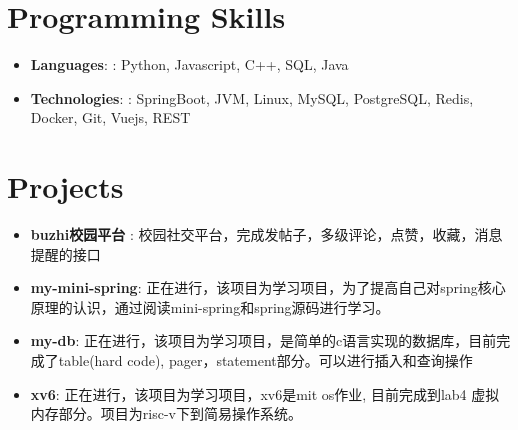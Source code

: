 \documentclass[letterpaper,11pt]{article}
\newcommand{\resumeItem}[2]{
  \item\small{
    \textbf{#1}{: #2 \vspace{-2pt}}
  }
}
\newcommand{\resumeSubItem}[2]{\resumeItem{#1}{#2}\vspace{-4pt}}
\newcommand{\resumeSubHeadingListStart}{\begin{itemize}[leftmargin=*]}
\newcommand{\resumeSubHeadingListEnd}{\end{itemize}}
\begin{document}
\section{Programming Skills}
 \resumeSubHeadingListStart
     \resumeItem{Languages}{: Python, Javascript, C++, SQL, Java} 
     \resumeItem{Technologies}{: SpringBoot, JVM, Linux, MySQL, PostgreSQL, Redis, Docker, Git, Vuejs, REST}
 \resumeSubHeadingListEnd


\section{Projects}
  \resumeSubHeadingListStart
    \resumeSubItem{buzhi校园平台 }
      {校园社交平台，完成发帖子，多级评论，点赞，收藏，消息提醒的接口}
    \resumeSubItem{my-mini-spring}
      {正在进行，该项目为学习项目，为了提高自己对spring核心原理的认识，通过阅读mini-spring和spring源码进行学习。}
    \resumeSubItem{my-db}
      {正在进行，该项目为学习项目，是简单的c语言实现的数据库，目前完成了table(hard code), pager，statement部分。可以进行插入和查询操作}
    \resumeSubItem{xv6}
      {正在进行，该项目为学习项目，xv6是mit os作业, 目前完成到lab4 虚拟内存部分。项目为risc-v下到简易操作系统。}
  \resumeSubHeadingListEnd

%



\end{document}
